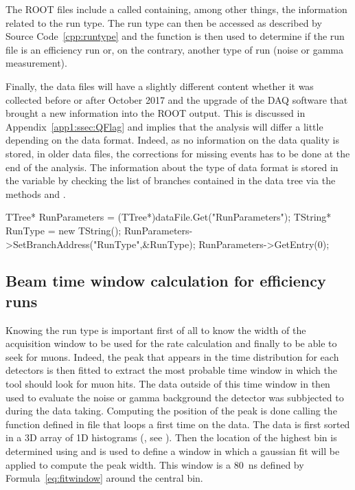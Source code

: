 	The ROOT files include a  called  containing, among other things, the information related to the run type. The run type can then be accessed as described by Source Code~\ref{cpp:runtype} and the function  is then used to determine if the run file is an efficiency run or, on the contrary, another type of run (noise or gamma measurement).
	
	Finally, the data files will have a slightly different content whether it was collected before or after October 2017 and the upgrade of the DAQ software that brought a new information into the ROOT output. This is discussed in Appendix~\ref{app1:ssec:QFlag} and implies that the analysis will differ a little depending on the data format. Indeed, as no information on the data quality is stored, in older data files, the corrections for missing events has to be done at the end of the analysis. The information about the type of data format is stored in the variable  by checking the list of branches contained in the data tree via the methods  and .\\
	
	\begin{code}
	\begin{cppcode}
TTree* RunParameters = (TTree*)dataFile.Get("RunParameters");
TString* RunType = new TString();
RunParameters->SetBranchAddress("RunType",&RunType);
RunParameters->GetEntry(0);
	\end{cppcode}
	\label{cpp:runtype}
	\vspace{5mm}
	\end{code}
	
	\subsection{Beam time window calculation for efficiency runs}
	\label{app2:ssec:beamwindow}
	
	Knowing the run type is important first of all to know the width of the acquisition window to be used for the rate calculation and finally to be able to seek for muons. Indeed, the peak that appears in the time distribution for each detectors is then fitted to extract the most probable time window in which the tool should look for muon hits. The data outside of this time window in then used to evaluate the noise or gamma background the detector was subbjected to during the data taking. Computing the position of the peak is done calling the function  defined in file  that loops a first time on the data. The data is first sorted in a 3D array of 1D histograms (, see ). Then the location of the highest bin is determined using  and is used to define a window in which a gaussian fit will be applied to compute the peak width. This window is a \SI{80}{ns} defined by Formula~\ref{eq:fitwindow} around the central bin.
	
